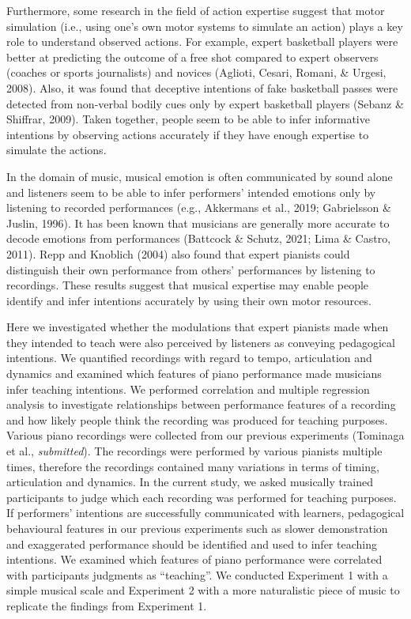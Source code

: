 \documentclass[
  man,floatsintext]{apa6}
\begin{document}
Furthermore, some research in the field of action expertise suggest that motor simulation (i.e., using one's own motor systems to simulate an action) plays a key role to understand observed actions. For example, expert basketball players were better at predicting the outcome of a free shot compared to expert observers (coaches or sports journalists) and novices (Aglioti, Cesari, Romani, \& Urgesi, 2008). Also, it was found that deceptive intentions of fake basketball passes were detected from non-verbal bodily cues only by expert basketball players (Sebanz \& Shiffrar, 2009). Taken together, people seem to be able to infer informative intentions by observing actions accurately if they have enough expertise to simulate the actions.

In the domain of music, musical emotion is often communicated by sound alone and listeners seem to be able to infer performers' intended emotions only by listening to recorded performances (e.g., Akkermans et al., 2019; Gabrielsson \& Juslin, 1996). It has been known that musicians are generally more accurate to decode emotions from performances (Battcock \& Schutz, 2021; Lima \& Castro, 2011). Repp and Knoblich (2004) also found that expert pianists could distinguish their own performance from others' performances by listening to recordings. These results suggest that musical expertise may enable people identify and infer intentions accurately by using their own motor resources.

Here we investigated whether the modulations that expert pianists made when they intended to teach were also perceived by listeners as conveying pedagogical intentions. We quantified recordings with regard to tempo, articulation and dynamics and examined which features of piano performance made musicians infer teaching intentions. We performed correlation and multiple regression analysis to investigate relationships between performance features of a recording and how likely people think the recording was produced for teaching purposes. Various piano recordings were collected from our previous experiments (Tominaga et al., \emph{submitted}). The recordings were performed by various pianists multiple times, therefore the recordings contained many variations in terms of timing, articulation and dynamics. In the current study, we asked musically trained participants to judge which each recording was performed for teaching purposes. If performers' intentions are successfully communicated with learners, pedagogical behavioural features in our previous experiments such as slower demonstration and exaggerated performance should be identified and used to infer teaching intentions. We examined which features of piano performance were correlated with participants judgments as ``teaching''. We conducted Experiment 1 with a simple musical scale and Experiment 2 with a more naturalistic piece of music to replicate the findings from Experiment 1.
\end{document}
